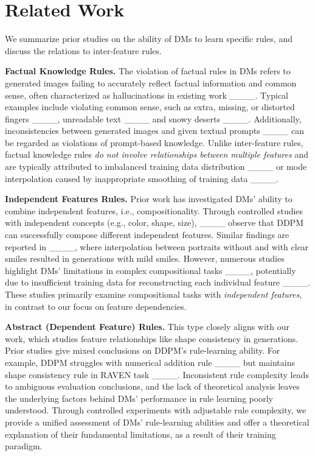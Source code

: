 \section{Related Work}
\label{sec:related}

We summarize prior studies on the ability of DMs to learn specific rules, and discuss the relations to inter-feature rules.


\textbf{Factual Knowledge Rules.} The violation of factual rules in DMs refers to generated images failing to accurately reflect factual information and common sense, often characterized as hallucinations in existing work ____. Typical examples include violating common sense, such as extra, missing, or distorted fingers ____, unreadable text ____ and snowy deserts ____. Additionally, inconsistencies between generated images and given textual prompts ____ can be regarded as violations of prompt-based knowledge. Unlike inter-feature rules, factual knowledge rules \textit{do not involve relationships between multiple features} and are typically attributed to imbalanced training data distribution ____ or mode interpolation caused by inappropriate smoothing of training data ____.

\textbf{Independent Features Rules.}  Prior work has investigated DMs' ability to combine independent features, i.e., compositionality. Through controlled studies with independent concepts (e.g., color, shape, size), ____ observe that DDPM can successfully compose different independent features. Similar findings are reported in ____, where interpolation between portraits without and with clear smiles resulted in generations with mild smiles. However, numerous studies highlight DMs' limitations in complex compositional tasks ____, potentially due to insufficient training data for reconstructing each individual feature ____. These studies primarily examine compositional tasks with \textit{independent features}, in contrast to our focus on feature dependencies.

\textbf{Abstract (Dependent Feature) Rules.} This type closely aligns with our work, which studies feature relationships like shape consistency in generations. Prior studies give mixed conclusions on DDPM's rule-learning ability. For example, DDPM struggles with numerical addition rule ____ but maintains shape consistency rule in RAVEN task ____. Inconsistent rule complexity leads to ambiguous evaluation conclusions, and the lack of theoretical analysis leaves the underlying factors behind DMs' performance in rule learning poorly understood. Through controlled experiments with adjustable rule complexity, we provide a unified assessment of DMs' rule-learning abilities and offer a theoretical explanation of their fundamental limitations, as a result of their training paradigm.